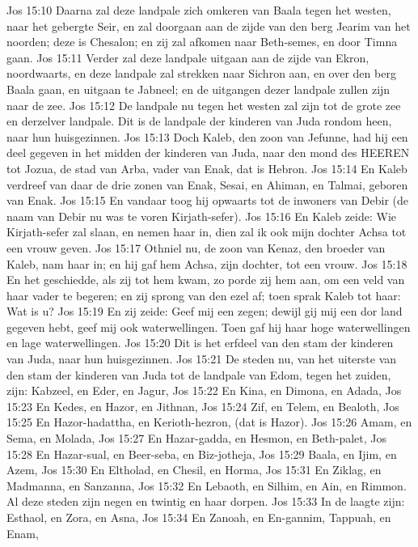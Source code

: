 Jos 15:10  Daarna zal deze landpale zich omkeren van Baala tegen het westen, naar het gebergte Seir, en zal doorgaan aan de zijde van den berg Jearim van het noorden; deze is Chesalon; en zij zal afkomen naar Beth-semes, en door Timna gaan.
Jos 15:11  Verder zal deze landpale uitgaan aan de zijde van Ekron, noordwaarts, en deze landpale zal strekken naar Sichron aan, en over den berg Baala gaan, en uitgaan te Jabneel; en de uitgangen dezer landpale zullen zijn naar de zee.
Jos 15:12  De landpale nu tegen het westen zal zijn tot de grote zee en derzelver landpale. Dit is de landpale der kinderen van Juda rondom heen, naar hun huisgezinnen.
Jos 15:13  Doch Kaleb, den zoon van Jefunne, had hij een deel gegeven in het midden der kinderen van Juda, naar den mond des HEEREN tot Jozua, de stad van Arba, vader van Enak, dat is Hebron.
Jos 15:14  En Kaleb verdreef van daar de drie zonen van Enak, Sesai, en Ahiman, en Talmai, geboren van Enak.
Jos 15:15  En vandaar toog hij opwaarts tot de inwoners van Debir (de naam van Debir nu was te voren Kirjath-sefer).
Jos 15:16  En Kaleb zeide: Wie Kirjath-sefer zal slaan, en nemen haar in, dien zal ik ook mijn dochter Achsa tot een vrouw geven.
Jos 15:17  Othniel nu, de zoon van Kenaz, den broeder van Kaleb, nam haar in; en hij gaf hem Achsa, zijn dochter, tot een vrouw.
Jos 15:18  En het geschiedde, als zij tot hem kwam, zo porde zij hem aan, om een veld van haar vader te begeren; en zij sprong van den ezel af; toen sprak Kaleb tot haar: Wat is u?
Jos 15:19  En zij zeide: Geef mij een zegen; dewijl gij mij een dor land gegeven hebt, geef mij ook waterwellingen. Toen gaf hij haar hoge waterwellingen en lage waterwellingen.
Jos 15:20  Dit is het erfdeel van den stam der kinderen van Juda, naar hun huisgezinnen.
Jos 15:21  De steden nu, van het uiterste van den stam der kinderen van Juda tot de landpale van Edom, tegen het zuiden, zijn: Kabzeel, en Eder, en Jagur,
Jos 15:22  En Kina, en Dimona, en Adada,
Jos 15:23  En Kedes, en Hazor, en Jithnan,
Jos 15:24  Zif, en Telem, en Bealoth,
Jos 15:25  En Hazor-hadattha, en Kerioth-hezron, (dat is Hazor).
Jos 15:26  Amam, en Sema, en Molada,
Jos 15:27  En Hazar-gadda, en Hesmon, en Beth-palet,
Jos 15:28  En Hazar-sual, en Beer-seba, en Biz-jotheja,
Jos 15:29  Baala, en Ijim, en Azem,
Jos 15:30  En Eltholad, en Chesil, en Horma,
Jos 15:31  En Ziklag, en Madmanna, en Sanzanna,
Jos 15:32  En Lebaoth, en Silhim, en Ain, en Rimmon. Al deze steden zijn negen en twintig en haar dorpen.
Jos 15:33  In de laagte zijn: Esthaol, en Zora, en Asna,
Jos 15:34  En Zanoah, en En-gannim, Tappuah, en Enam,
